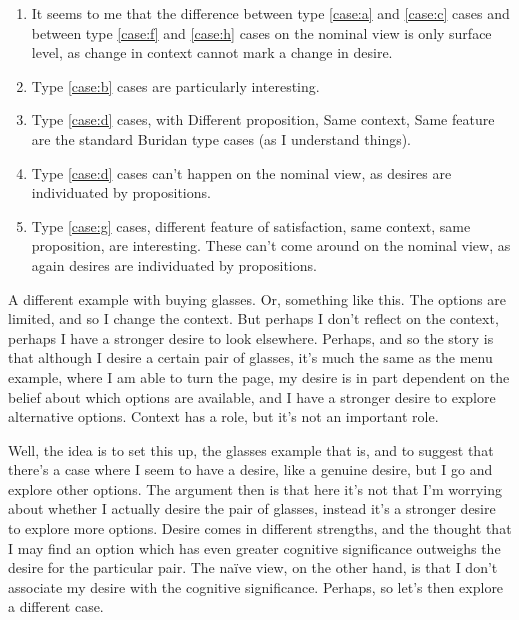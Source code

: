 \documentclass[10pt]{article}
\begin{document}
\begin{enumerate}
\item It seems to me that the difference between type \ref{case:a} and \ref{case:c} cases and between type \ref{case:f} and \ref{case:h} cases on the nominal view is only surface level, as change in context cannot mark a change in desire.
\item Type \ref{case:b} cases are particularly interesting.
\item Type \ref{case:d} cases, with Different proposition, Same context, Same feature are the standard Buridan type cases (as I understand things).
\item Type \ref{case:d} cases can't happen on the nominal view, as desires are individuated by propositions.
\item Type \ref{case:g} cases, different feature of satisfaction, same context, same proposition, are interesting.
  These can't come around on the nominal view, as again desires are individuated by propositions.
\end{enumerate}





\newpage




A different example with buying glasses.
Or, something like this.
The options are limited, and so I change the context.
But perhaps I don't reflect on the context, perhaps I have a stronger desire to look elsewhere.
Perhaps, and so the story is that although I desire a certain pair of glasses, it's much the same as the menu example, where I am able to turn the page, my desire is in part dependent on the belief about which options are available, and I have a stronger desire to explore alternative options.
Context has a role, but it's not an important role.

Well, the idea is to set this up, the glasses example that is, and to suggest that there's a case where I seem to have a desire, like a genuine desire, but I go and explore other options.
The argument then is that here it's not that I'm worrying about whether I actually desire the pair of glasses, instead it's a stronger desire to explore more options.
Desire comes in different strengths, and the thought that I may find an option which has even greater cognitive significance outweighs the desire for the particular pair.
The na\"{i}ve view, on the other hand, is that I don't associate my desire with the cognitive significance.
Perhaps, so let's then explore a different case.
\end{document}
